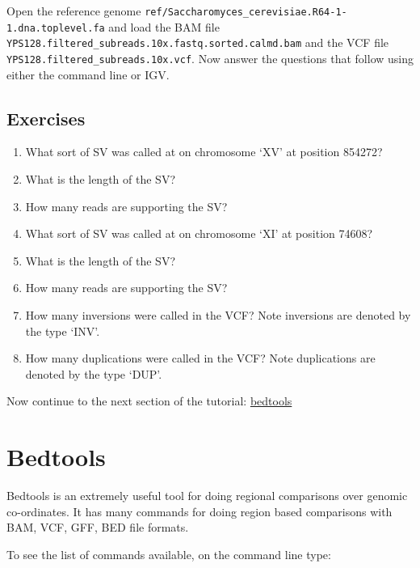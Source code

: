 \documentclass[11pt]{article}
\providecommand{\tightlist}{%
      \setlength{\itemsep}{0pt}\setlength{\parskip}{0pt}}
\begin{document}
    Open the reference genome
\texttt{ref/Saccharomyces\_cerevisiae.R64-1-1.dna.toplevel.fa} and load
the BAM file
\texttt{YPS128.filtered\_subreads.10x.fastq.sorted.calmd.bam} and the
VCF file \texttt{YPS128.filtered\_subreads.10x.vcf}. Now answer the
questions that follow using either the command line or IGV.

    \hypertarget{exercises}{%
\subsection{Exercises}\label{exercises}}

\begin{enumerate}
\def\labelenumi{\arabic{enumi}.}
\tightlist
\item
  What sort of SV was called at on chromosome `XV' at position 854272?
\item
  What is the length of the SV?
\item
  How many reads are supporting the SV?
\item
  What sort of SV was called at on chromosome `XI' at position 74608?
\item
  What is the length of the SV?
\item
  How many reads are supporting the SV?
\item
  How many inversions were called in the VCF? Note inversions are
  denoted by the type `INV'.
\item
  How many duplications were called in the VCF? Note duplications are
  denoted by the type `DUP'.
\end{enumerate}

    Now continue to the next section of the tutorial:
\href{bedtools.ipynb}{bedtools}





\newpage





    \hypertarget{bedtools}{%
\section{Bedtools}\label{bedtools}}

Bedtools is an extremely useful tool for doing regional comparisons over
genomic co-ordinates. It has many commands for doing region based
comparisons with BAM, VCF, GFF, BED file formats.

To see the list of commands available, on the command line type:
\end{document}

